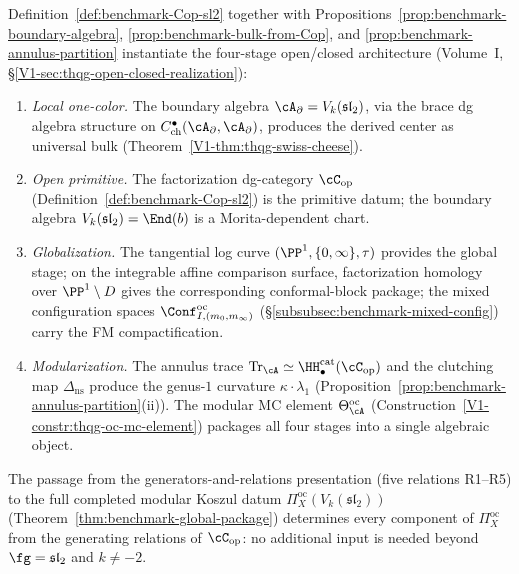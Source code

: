 \begin{remark}
\label{rem:benchmark-primitive-instantiation}
Definition~\ref{def:benchmark-Cop-sl2} together with
Propositions~\ref{prop:benchmark-boundary-algebra},
\ref{prop:benchmark-bulk-from-Cop}, and
\ref{prop:benchmark-annulus-partition} instantiate the four-stage
open/closed architecture
(Volume~I, \S\ref*{V1-sec:thqg-open-closed-realization}):
\begin{enumerate}[label=\textup{Stage \arabic*.},nosep,
 leftmargin=3em]
\item \emph{Local one-color.}
 The boundary algebra $\cA_\partial = V_k(\mathfrak{sl}_2)$,
 via the brace dg algebra structure on
 $C^\bullet_{\mathrm{ch}}(\cA_\partial, \cA_\partial)$,
 produces the derived center as universal bulk
 (Theorem~\ref*{V1-thm:thqg-swiss-cheese}).

\item \emph{Open primitive.}
 The factorization dg-category
 $\cC_{\mathrm{op}}$
 (Definition~\ref{def:benchmark-Cop-sl2})
 is the primitive datum; the boundary algebra
 $V_k(\mathfrak{sl}_2) = \End(b)$ is a Morita-dependent chart.

\item \emph{Globalization.}
 The tangential log curve
 $(\PP^1, \{0,\infty\}, \tau)$ provides the global stage;
 on the integrable affine comparison surface,
 factorization homology over $\PP^1 \setminus D$ gives the
 corresponding conformal-block package; the mixed configuration spaces
 $\Conf^{\mathrm{oc}}_{I,(m_0,m_\infty)}$
 (\S\ref{subsubsec:benchmark-mixed-config}) carry the FM
 compactification.

\item \emph{Modularization.}
 The annulus trace
 $\mathrm{Tr}_\cA \simeq \HH^{\mathrm{cat}}_\bullet(\cC_{\mathrm{op}})$ and the
 clutching map $\Delta_{\mathrm{ns}}$ produce the genus-$1$
 curvature $\kappa \cdot \lambda_1$
 (Proposition~\ref{prop:benchmark-annulus-partition}(ii)).
 The modular MC element $\Theta^{\mathrm{oc}}_\cA$
 (Construction~\ref*{V1-constr:thqg-oc-mc-element}) packages
 all four stages into a single algebraic object.
\end{enumerate}
The passage from the generators-and-relations presentation
(five relations R1--R5) to the full completed modular Koszul datum
$\Pi^{\mathrm{oc}}_X(V_k(\mathfrak{sl}_2))$
(Theorem~\ref{thm:benchmark-global-package})
determines every component of
$\Pi^{\mathrm{oc}}_X$ from the generating
relations of $\cC_{\mathrm{op}}$: no additional input is
needed beyond $\fg = \mathfrak{sl}_2$ and $k \ne -2$.
\end{remark}

